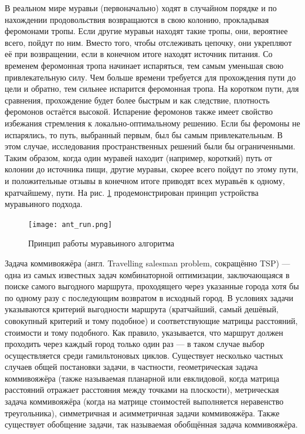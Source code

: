 \documentclass[a4paper, 14pt]{article}
\begin{document}
В реальном мире муравьи (первоначально) ходят в случайном порядке и по нахождении продовольствия возвращаются в свою колонию, прокладывая феромонами тропы. Если другие муравьи находят такие тропы, они, вероятнее всего, пойдут по ним. Вместо того, чтобы отслеживать цепочку, они укрепляют её при возвращении, если в конечном итоге находят источник питания. Со временем феромонная тропа начинает испаряться, тем самым уменьшая свою привлекательную силу. Чем больше времени требуется для прохождения пути до цели и обратно, тем сильнее испарится феромонная тропа. На коротком пути, для сравнения, прохождение будет более быстрым и как следствие, плотность феромонов остаётся высокой. Испарение феромонов также имеет свойство избежания стремления к локально-оптимальному решению. Если бы феромоны не испарялись, то путь, выбранный первым, был бы самым привлекательным. В этом случае, исследования пространственных решений были бы ограниченными. Таким образом, когда один муравей находит (например, короткий) путь от колонии до источника пищи, другие муравьи, скорее всего пойдут по этому пути, и положительные отзывы в конечном итоге приводят всех муравьёв к одному, кратчайшему, пути\cite{ant_info}. На рис.  \ref{ris:ant_run} продемонстрирован принцип устройства муравьиного подхода\cite{ant_work_image}.


\begin{figure}[h]
\center
\texttt{[image: ant\_run.png]}
\caption{Принцип работы муравьиного алгоритма}
\label{ris:ant_run}
\end{figure}

\newpage
Задача коммивояжёра (англ. Travelling salesman problem, сокращённо TSP) — одна из самых известных задач комбинаторной оптимизации, заключающаяся в поиске самого выгодного маршрута, проходящего через указанные города хотя бы по одному разу с последующим возвратом в исходный город. В условиях задачи указываются критерий выгодности маршрута (кратчайший, самый дешёвый, совокупный критерий и тому подобное) и соответствующие матрицы расстояний, стоимости и тому подобного. Как правило, указывается, что маршрут должен проходить через каждый город только один раз — в таком случае выбор осуществляется среди гамильтоновых циклов. Существует несколько частных случаев общей постановки задачи, в частности, геометрическая задача коммивояжёра (также называемая планарной или евклидовой, когда матрица расстояний отражает расстояния между точками на плоскости), метрическая задача коммивояжёра (когда на матрице стоимостей выполняется неравенство треугольника), симметричная и асимметричная задачи коммивояжёра. Также существует обобщение задачи, так называемая обобщённая задача коммивояжёра.
\end{document}
